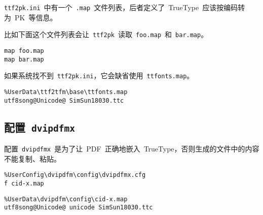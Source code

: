 \verb|ttf2pk.ini|~中有一个~\verb|.map|~文件列表，后者定义了~TrueType~应该按编码转为~PK~等信息。

比如下面这个文件列表会让~\verb|ttf2pk|~读取~\verb|foo.map|~和~\verb|bar.map|。

\begin{lstlisting}
map foo.map
map bar.map
\end{lstlisting}

如果系统找不到~\verb|ttf2pk.ini|，它会缺省使用~\verb|ttfonts.map|。
\begin{lstlisting}
%UserData\ttf2tfm\base\ttfonts.map
utf8song@Unicode@ SimSun18030.ttc
\end{lstlisting}

\subsection{配置~\texttt{dvipdfmx}}
配置~\verb|dvipdfmx|~是为了让~PDF~正确地嵌入~TrueType，否则生成的文件中的内容不能复制、粘贴。

\begin{lstlisting}
%UserConfig\dvipdfm\config\dvipdfmx.cfg
f cid-x.map
\end{lstlisting}

\begin{lstlisting}
%UserData\dvipdfm\config\cid-x.map
utf8song@Unicode@ unicode SimSun18030.ttc
\end{lstlisting}



\newpage
